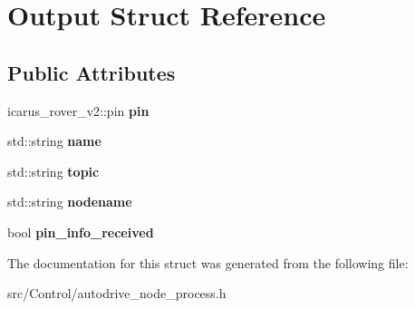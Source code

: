 \hypertarget{structOutput}{}\section{Output Struct Reference}
\label{structOutput}
\subsection*{Public Attributes}
\begin{DoxyCompactItemize}
\item 
\mbox{\label{structOutput_aecd589769fa4d00c49a7dbe5566fbaba}} 
icarus\+\_\+rover\+\_\+v2\+::pin {\bfseries pin}
\item 
\mbox{\label{structOutput_a762a44558b0e3b5f85be798e97bfe8fa}} 
std\+::string {\bfseries name}
\item 
\mbox{\label{structOutput_a7506781c33102ad1fc59c1ef795b91dc}} 
std\+::string {\bfseries topic}
\item 
\mbox{\label{structOutput_a4ac336675a79fec171baafb5c0fbfe3e}} 
std\+::string {\bfseries nodename}
\item 
\mbox{\label{structOutput_ab3e5569104227caa4cb30c0437b74129}} 
bool {\bfseries pin\+\_\+info\+\_\+received}
\end{DoxyCompactItemize}


The documentation for this struct was generated from the following file\+:\begin{DoxyCompactItemize}
\item 
src/\+Control/autodrive\+\_\+node\+\_\+process.\+h\end{DoxyCompactItemize}
